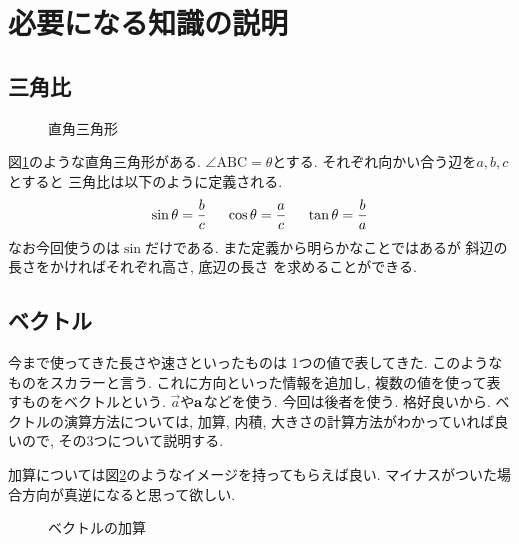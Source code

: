 \documentclass[a4paper, xelatex, ja=standard]{bxjsarticle}
\begin{document}
\section{必要になる知識の説明}
\subsection*{三角比}
\begin{figure}[h]
\centering
{}
\caption{直角三角形}
\label{fig:sin-triangle}
\end{figure}

図\ref{fig:sin-triangle}のような直角三角形がある.
$\angle\mathrm{ABC}=\theta$とする.
それぞれ向かい合う辺を$a, b, c$とすると
三角比は以下のように定義される.
\[
\sin{\theta}=\frac{b}{c}\hspace{5mm}
\cos{\theta}=\frac{a}{c}\hspace{5mm}
\tan{\theta}=\frac{b}{a}
\]
なお今回使うのは$\sin$だけである.
また定義から明らかなことではあるが
斜辺の長さをかければそれぞれ高さ, 底辺の長さ
を求めることができる.

\subsection*{ベクトル}
今まで使ってきた長さや速さといったものは
1つの値で表してきた.
このようなものをスカラーと言う.
これに方向といった情報を追加し,
複数の値を使って表すものをベクトルという.
$\vec{a}$や$\vb{a}$などを使う.
今回は後者を使う. 格好良いから.
ベクトルの演算方法については,
加算, 内積, 大きさの計算方法がわかっていれば良いので, 
その3つについて説明する.

加算については図\ref{fig:vector-add}のようなイメージを持ってもらえば良い.
マイナスがついた場合方向が真逆になると思って欲しい.
\begin{figure}[h]
\centering
\caption{ベクトルの加算}
\label{fig:vector-add}
\end{figure}
\end{document}
